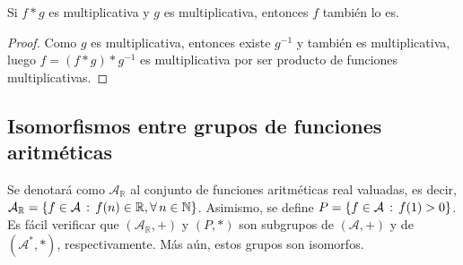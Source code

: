 \thispagestyle{easter4}

\begin{corollary}
Si $f*g$ es multiplicativa y $g$ es multiplicativa, entonces $f$ también lo es.
\end{corollary}
\begin{proof}
Como $g$ es multiplicativa, entonces existe $g^{-1}$ y también es multiplicativa, luego $f=(f*g)*g^{-1}$ es multiplicativa por ser producto de funciones multiplicativas.
\end{proof}

\subsection{Isomorfismos entre grupos de funciones aritméticas}

Se denotará como $\mathcal{A}_\mathbb{R}$ al conjunto de funciones aritméticas real valuadas, es decir, $\mathcal{A}_{\mathbb{R}}=\{ f \in \mathcal{A} \std f(n) \in \mathbb{R}, \forall n \in \mathbb{N} \}$. Asimismo, se define $P=\{ f \in \mathcal{A} \, : \, f(1)>0 \}$. Es fácil verificar que $(\mathcal{A}_{\mathbb{R}},+)$ y $(P,*)$ son subgrupos de $(\mathcal{A},+)$ y de $(\mathcal{A}^*,*)$, respectivamente. Más aún, estos grupos son isomorfos.

